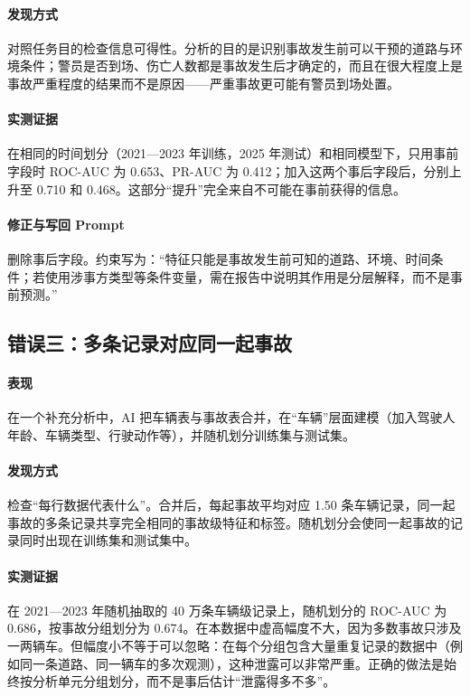 \paragraph{发现方式} 对照任务目的检查信息可得性。分析的目的是识别事故发生前可以干预的道路与环境条件；警员是否到场、伤亡人数都是事故发生后才确定的，而且在很大程度上是事故严重程度的结果而不是原因——严重事故更可能有警员到场处置。

\paragraph{实测证据} 在相同的时间划分（2021—2023 年训练，2025 年测试）和相同模型下，只用事前字段时 ROC-AUC 为 0.653、PR-AUC 为 0.412；加入这两个事后字段后，分别上升至 0.710 和 0.468。这部分“提升”完全来自不可能在事前获得的信息。

\paragraph{修正与写回 Prompt} 删除事后字段。约束写为：“特征只能是事故发生前可知的道路、环境、时间条件；若使用涉事方类型等条件变量，需在报告中说明其作用是分层解释，而不是事前预测。”

\subsection{错误三：多条记录对应同一起事故}

\paragraph{表现} 在一个补充分析中，AI 把车辆表与事故表合并，在“车辆”层面建模（加入驾驶人年龄、车辆类型、行驶动作等），并随机划分训练集与测试集。

\paragraph{发现方式} 检查“每行数据代表什么”。合并后，每起事故平均对应 1.50 条车辆记录，同一起事故的多条记录共享完全相同的事故级特征和标签。随机划分会使同一起事故的记录同时出现在训练集和测试集中。

\paragraph{实测证据} 在 2021—2023 年随机抽取的 40 万条车辆级记录上，随机划分的 ROC-AUC 为 0.686，按事故分组划分为 0.674。在本数据中虚高幅度不大，因为多数事故只涉及一两辆车。但幅度小不等于可以忽略：在每个分组包含大量重复记录的数据中（例如同一条道路、同一辆车的多次观测），这种泄露可以非常严重。正确的做法是始终按分析单元分组划分，而不是事后估计“泄露得多不多”。

